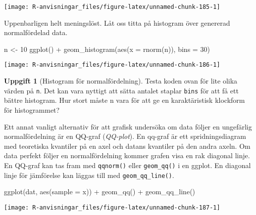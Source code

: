 \documentclass[
]{book}
\newenvironment{Shaded}{\begin{snugshade}}{\end{snugshade}}
\newcommand{\AttributeTok}[1]{\textcolor[rgb]{0.77,0.63,0.00}{#1}}
\newcommand{\DecValTok}[1]{\textcolor[rgb]{0.00,0.00,0.81}{#1}}
\newcommand{\FunctionTok}[1]{\textcolor[rgb]{0.00,0.00,0.00}{#1}}
\newcommand{\NormalTok}[1]{#1}
\newcommand{\OtherTok}[1]{\textcolor[rgb]{0.56,0.35,0.01}{#1}}
\newcommand{\SpecialCharTok}[1]{\textcolor[rgb]{0.00,0.00,0.00}{#1}}
\theoremstyle{definition}
\theoremstyle{definition}
\theoremstyle{definition}
\newtheorem{exercise}{Uppgift}[chapter]
\theoremstyle{definition}
\theoremstyle{remark}
\begin{document}
\begin{center}\texttt{[image: R-anvisningar\_files/figure-latex/unnamed-chunk-185-1]} \end{center}

Uppenbarligen helt meningslöst. Låt oss titta på histogram över genererad normalfördelad data.

\begin{Shaded}
\begin{Highlighting}[]
\NormalTok{n }\OtherTok{\textless{}{-}} \DecValTok{10}
\FunctionTok{ggplot}\NormalTok{() }\SpecialCharTok{+} \FunctionTok{geom\_histogram}\NormalTok{(}\FunctionTok{aes}\NormalTok{(}\AttributeTok{x =} \FunctionTok{rnorm}\NormalTok{(n)), }\AttributeTok{bins =} \DecValTok{30}\NormalTok{)}
\end{Highlighting}
\end{Shaded}

\begin{center}\texttt{[image: R-anvisningar\_files/figure-latex/unnamed-chunk-186-1]} \end{center}

\begin{exercise}[Histogram för normalfördelning]
Testa koden ovan för lite olika värden på \texttt{n}. Det kan vara nyttigt att sätta antalet staplar \texttt{bins} för att få ett bättre histogram. Hur stort måste n vara för att ge en karaktäristisk klockform för histogrammet?
\end{exercise}

Ett annat vanligt alternativ för att grafisk undersöka om data följer en ungefärlig normalfördelning är en QQ-graf (\emph{QQ-plot}). En qq-graf är ett spridningsdiagram med teoretiska kvantiler på en axel och datans kvantiler på den andra axeln. Om data perfekt följer en normalfördelning kommer grafen visa en rak diagonal linje. En QQ-graf kan tas fram med \texttt{qqnorm()} eller \texttt{geom\_qq()} i en ggplot. En diagonal linje för jämförelse kan läggas till med \texttt{geom\_qq\_line()}.

\begin{Shaded}
\begin{Highlighting}[]
\FunctionTok{ggplot}\NormalTok{(dat, }\FunctionTok{aes}\NormalTok{(}\AttributeTok{sample =}\NormalTok{ x)) }\SpecialCharTok{+} \FunctionTok{geom\_qq}\NormalTok{() }\SpecialCharTok{+} \FunctionTok{geom\_qq\_line}\NormalTok{()}
\end{Highlighting}
\end{Shaded}

\begin{center}\texttt{[image: R-anvisningar\_files/figure-latex/unnamed-chunk-187-1]} \end{center}
\end{document}
